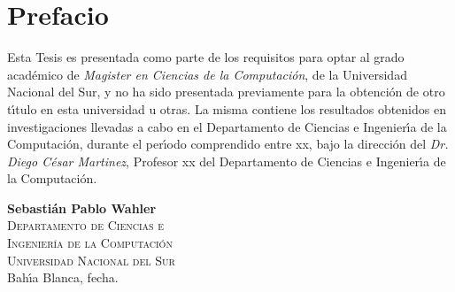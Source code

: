 


\thispagestyle{empty}
\chapter*{Prefacio}

Esta Tesis es presentada como parte de los requisitos para optar
al grado aca\-d\'e\-mi\-co de \emph{Magister en Ciencias de la Computaci\'on}, de la Universidad Nacional del Sur, 
y no ha sido presentada previamente para la obtenci\'on de otro t\'{\i}tulo en
esta universidad u otras. La misma contiene los resultados
obtenidos en investigaciones llevadas a cabo en el Departamento de
Ciencias e Ingenier\'{\i}a de la Computaci\'on, durante el
per\'{\i}odo comprendido entre xx, bajo la direcci\'on del \emph{Dr. Diego C\'esar Martinez}, Profesor
xx del Departamento de Ciencias e Ingenier\'{\i}a de la
Computaci\'on.


\vspace*{5cm}

{\flushright
\textbf{Sebasti\'an Pablo Wahler}\\
\textsc{Departamento de Ciencias e}\\
\textsc{Ingenier\'{\i}a de la Computaci\'on}\\
\textsc{Universidad Nacional del Sur}\\
Bah\'{\i}a Blanca, fecha.\\}
